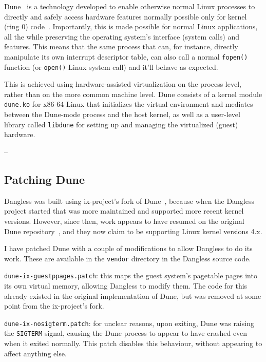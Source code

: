 Dune~\cite{dune-website} is a technology developed to enable otherwise normal Linux processes to directly and safely access hardware features normally possible only for kernel (ring 0) code~\cite{dune-paper}. Importantly, this is made possible for normal Linux applications, all the while preserving the operating system's interface (system calls) and features. This means that the same process that can, for instance, directly manipulate its own interrupt descriptor table, can also call a normal \lstinline!fopen()! function (or \lstinline!open()! Linux system call) and it'll behave as expected.

This is achieved using hardware-assisted virtualization on the process level, rather than on the more common machine level. Dune consists of a kernel module \texttt{dune.ko} for x86-64 Linux that initializes the virtual environment and mediates between the Dune-mode process and the host kernel, as well as a user-level library called \texttt{libdune} for setting up and managing the virtualized (guest) hardware.

--

\subsection{Patching Dune}

Dangless was built using ix-project's fork of Dune~\cite{dune-github-ix}, because when the Dangless project started that was more maintained and supported more recent kernel versions. However, since then, work appears to have resumed on the original Dune repository~\cite{dune-github-original}, and they now claim to be supporting Linux kernel versions 4.x.

I have patched Dune with a couple of modifications to allow Dangless to do its work. These are available in the \texttt{vendor} directory in the Dangless source code.

\texttt{dune-ix-guestppages.patch}: this maps the guest system's pagetable pages into its own virtual memory, allowing Dangless to modify them. The code for this already existed in the original implementation of Dune, but was removed at some point from the ix-project's fork.
 
\texttt{dune-ix-nosigterm.patch}: for unclear reasons, upon exiting, Dune was raising the \lstinline!SIGTERM! signal, causing the Dune process to appear to have crashed even when it exited normally. This patch disables this behaviour, without appearing to affect anything else.

